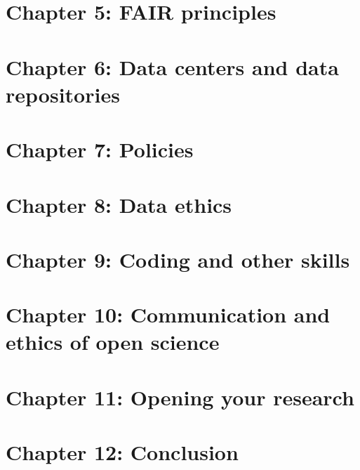\documentclass[
]{book}
\theoremstyle{definition}
\theoremstyle{definition}
\theoremstyle{definition}
\theoremstyle{definition}
\theoremstyle{remark}
\begin{document}
\hypertarget{chapter-5-fair-principles}{%
\chapter{Chapter 5: FAIR principles}\label{chapter-5-fair-principles}}

\hypertarget{chapter-6-data-centers-and-data-repositories}{%
\chapter{Chapter 6: Data centers and data repositories}\label{chapter-6-data-centers-and-data-repositories}}

\hypertarget{chapter-7-policies}{%
\chapter{Chapter 7: Policies}\label{chapter-7-policies}}

\hypertarget{chapter-8-data-ethics}{%
\chapter{Chapter 8: Data ethics}\label{chapter-8-data-ethics}}

\hypertarget{chapter-9-coding-and-other-skills}{%
\chapter{Chapter 9: Coding and other skills}\label{chapter-9-coding-and-other-skills}}

\hypertarget{chapter-10-communication-and-ethics-of-open-science}{%
\chapter{Chapter 10: Communication and ethics of open science}\label{chapter-10-communication-and-ethics-of-open-science}}

\hypertarget{chapter-11-opening-your-research}{%
\chapter{Chapter 11: Opening your research}\label{chapter-11-opening-your-research}}

\hypertarget{chapter-12-conclusion}{%
\chapter{Chapter 12: Conclusion}\label{chapter-12-conclusion}}
\end{document}
